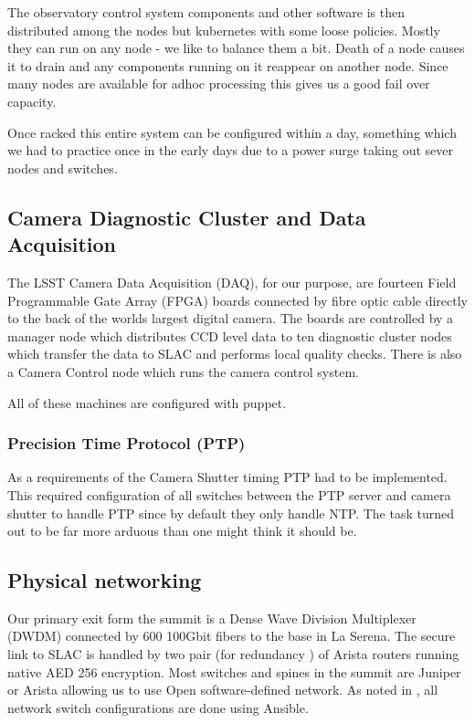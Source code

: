 The observatory control system components and other software is then distributed among the nodes but kubernetes
with some loose policies.
Mostly they can run on any node - we like to balance them a bit.
Death of a node causes it to drain and any components running on it reappear on another node.
Since many nodes are available for adhoc processing this gives us a good fail over capacity.

Once racked this entire system can be configured within a day, something which we had to practice once in the early days due to a power surge taking out sever nodes and switches.






\subsection{Camera Diagnostic Cluster and Data Acquisition \label{sec:cdc}}

The LSST Camera Data Acquisition (DAQ), for our purpose, are fourteen Field Programmable Gate Array (FPGA) boards connected by fibre optic cable directly to the back of the worlds largest digital camera.
The boards are controlled by a manager node which distributes CCD level data to ten diagnostic cluster nodes which transfer the data to SLAC and performs local quality checks.
There is also a Camera Control node which runs the camera control system.

All of these machines are configured with puppet.

\subsubsection{Precision Time Protocol (PTP)}

As a requirements of the Camera Shutter timing PTP had to be implemented.
This required configuration of all switches between the PTP server and camera shutter to handle PTP since by default they only handle NTP.
The task turned out to be far more arduous than one might think it should be.

\subsection{Physical networking}
Our primary exit form the summit is a Dense Wave Division Multiplexer (DWDM) connected by 600 100Gbit fibers to the base in La Serena.
The secure link to SLAC is handled by two pair (for redundancy ) of Arista routers running native AED 256 encryption.
Most switches and spines in the summit are Juniper or Arista allowing us to use Open software-defined network.
As noted in , all network switch configurations are done using Ansible.


